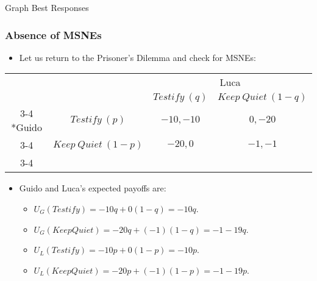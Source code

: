 \begin{frame}{Graph Best Responses}
 
\end{frame}

\begin{frame}
\frametitle{Absence of MSNEs}
\begin{itemize}
	\item Let us return to the Prisoner's Dilemma and check for MSNEs:
\end{itemize}
\begin{table}[h]
	\centering
	\begin{tabular}{cc|c|c|}
		& \multicolumn{1}{c}{} & \multicolumn{2}{c}{Luca}\\
		& \multicolumn{1}{c}{} & \multicolumn{1}{c}{$Testify~(q)$}  & \multicolumn{1}{c}{$Keep~Quiet~(1-q)$} \\\cline{3-4}
		\multirow{2}*{Guido}  & $Testify~(p)$ & $-10,-10$ & $0,-20$ \\\cline{3-4}
		& $Keep~Quiet~(1-p)$ & $-20,0$ & $-1,-1$ \\\cline{3-4}
	\end{tabular}
\end{table}
\begin{itemize}
	\item Guido and Luca's expected payoffs are:
	\begin{itemize}
		\item $U_G(Testify) = -10q + 0(1 - q) = -10q$.
		\item $U_G(Keep Quiet) = -20q + (-1)(1 - q) = -1 - 19q$.
		\item $U_L(Testify) = -10p + 0(1 - p) = -10p$.
		\item $U_L(Keep Quiet) = -20p + (-1)(1 - p) = -1 - 19p$.
	\end{itemize}
\end{itemize}
\end{frame}

